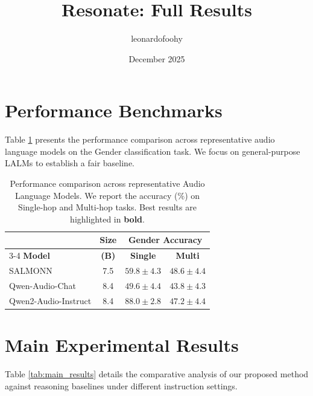 \documentclass{article}
\title{Resonate: Full Results}
\author{leonardofoohy}
\date{December 2025}
\begin{document}
\maketitle

\section{Performance Benchmarks}

Table \ref{tab:model_comparison} presents the performance comparison across representative audio language models on the Gender classification task. We focus on general-purpose LALMs to establish a fair baseline.

\begin{table}[h]
    \centering
    \caption{Performance comparison across representative Audio Language Models. We report the accuracy ($\%$) on Single-hop and Multi-hop tasks. Best results are highlighted in \textbf{bold}.}
    \label{tab:model_comparison}
    
    \setlength{\tabcolsep}{10pt}
    
    \begin{tabular}{lccc}
        \toprule
        & \textbf{Size} & \multicolumn{2}{c}{\textbf{Gender Accuracy}} \\ 
        \cmidrule(lr){3-4} 
        \textbf{Model} & \textbf{(B)} & \textbf{Single} & \textbf{Multi} \\
        \midrule
        SALMONN                 & 7.5 & $59.8 \pm 4.3$ & $\mathbf{48.6 \pm 4.4}$ \\
        Qwen-Audio-Chat         & 8.4 & $49.6 \pm 4.4$ & $43.8 \pm 4.3$ \\
        Qwen2-Audio-Instruct    & 8.4 & $\mathbf{88.0 \pm 2.8}$ & $47.2 \pm 4.4$ \\
        \bottomrule
    \end{tabular}
\end{table}

\section{Main Experimental Results}

Table \ref{tab:main_results} details the comparative analysis of our proposed method against reasoning baselines under different instruction settings.
\end{document}
